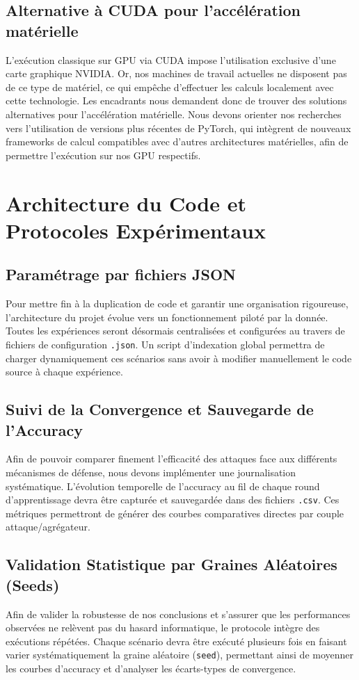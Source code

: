 \documentclass[11pt, a4paper]{article}
\begin{document}
\subsection{Alternative à CUDA pour l'accélération matérielle}
L'exécution classique sur GPU via CUDA impose l'utilisation exclusive d'une carte graphique NVIDIA. Or, nos machines de travail actuelles ne disposent pas de ce type de matériel, ce qui empêche d'effectuer les calculs localement avec cette technologie. Les encadrants nous demandent donc de trouver des solutions alternatives pour l'accélération matérielle. Nous devons orienter nos recherches vers l'utilisation de versions plus récentes de PyTorch, qui intègrent de nouveaux frameworks de calcul compatibles avec d'autres architectures matérielles, afin de permettre l'exécution sur nos GPU respectifs.

\section{Architecture du Code et Protocoles Expérimentaux}

\subsection{Paramétrage par fichiers JSON}
Pour mettre fin à la duplication de code et garantir une organisation rigoureuse, l'architecture du projet évolue vers un fonctionnement piloté par la donnée. Toutes les expériences seront désormais centralisées et configurées au travers de fichiers de configuration \texttt{.json}. Un script d'indexation global permettra de charger dynamiquement ces scénarios sans avoir à modifier manuellement le code source à chaque expérience.

\subsection{Suivi de la Convergence et Sauvegarde de l'Accuracy}
Afin de pouvoir comparer finement l'efficacité des attaques face aux différents mécanismes de défense, nous devons implémenter une journalisation systématique. L'évolution temporelle de l'accuracy au fil de chaque round d'apprentissage devra être capturée et sauvegardée dans des fichiers \texttt{.csv}. Ces métriques permettront de générer des courbes comparatives directes par couple attaque/agrégateur.

\subsection{Validation Statistique par Graines Aléatoires (Seeds)}
Afin de valider la robustesse de nos conclusions et s'assurer que les performances observées ne relèvent pas du hasard informatique, le protocole intègre des exécutions répétées. Chaque scénario devra être exécuté plusieurs fois en faisant varier systématiquement la graine aléatoire (\texttt{seed}), permettant ainsi de moyenner les courbes d'accuracy et d'analyser les écarts-types de convergence.
\end{document}
